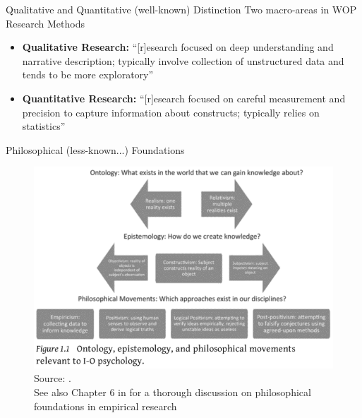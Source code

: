 \documentclass{beamer}
\begin{document}
\begin{frame}{Qualitative and Quantitative (well-known) Distinction}
    Two macro-areas in WOP Research Methods
    \begin{itemize}
        \item \textbf{Qualitative Research:} ``[r]esearch focused on deep understanding and narrative description; typically involve collection of unstructured data and tends to be more exploratory''\begin{footnotesize}\parencite[p. 443]{landers2024}\end{footnotesize}    
        \item \textbf{Quantitative Research:} ``[r]esearch focused on careful measurement and precision to capture information about constructs; typically relies on statistics''\begin{footnotesize}\parencite[p. 443]{landers2024}\end{footnotesize}
    \end{itemize}
\end{frame}

\begin{frame}{Philosophical (less-known...) Foundations}
    \begin{figure}
        \centering
        \includegraphics[width=0.9\linewidth]{figs/Philosopical.png}
        \caption{{\small Source: \textcite[p. 5]{landers2024}.\\See also Chapter 6 in \textcite{braun2022thematic} for a thorough discussion on philosophical foundations in empirical research}}
        \label{fig:philos}
    \end{figure}
\end{frame}
\end{document}
